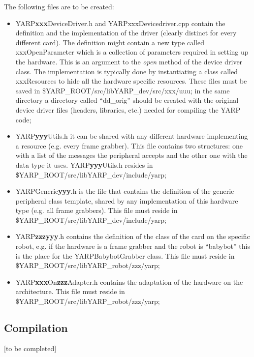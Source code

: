 The following files are to be created:
\begin{itemize}

\item YARP{\bf xxx}DeviceDriver.h and YARPxxxDevicedriver.cpp contain the definition and the implementation of the driver (clearly distinct for every different card). The definition might contain a new type called xxxOpenParameter which is a collection of parameters required in setting up the hardware. This is an argument to the {\em open} method of the device driver class. The implementation is typically done by instantiating a class called xxxResources to hide all the hardware specific resources. These files must be saved in \$YARP\_ROOT/src/libYARP\_dev/src/xxx/uuu; in the same directory a directory called ``dd\_orig'' should be created with the original device driver files (headers, libraries, etc.) needed for compiling the YARP code;

\item YARP{\bf yyy}Utils.h it can be shared with any different hardware implementing a resource (e.g. every frame grabber). This file contains two structures: one with a list of the messages the peripheral accepts and the other one with the data type it uses. YARP{\bf yyy}Utils.h resides in \$YARP\_ROOT/src/libYARP\_dev/include/yarp;

\item YARPGeneric{\bf yyy}.h is the file that contains the definition of the generic peripheral class template, shared by any implementation of this hardware type (e.g. all frame grabbers). This file must reside in \$YARP\_ROOT/src/libYARP\_dev/include/yarp;


\item YARP{\bf zzzyyy}.h contains the definition of the class of the card on the specific robot, e.g. if the hardware is a frame grabber and the robot is ``babybot'' this is the place for the YARPBabybotGrabber class. This file must reside in \$YARP\_ROOT/src/libYARP\_robot/zzz/yarp;

\item YARP{\bf xxx}On{\bf zzz}Adapter.h contains the adaptation of the hardware on the architecture. This file must reside in \$YARP\_ROOT/src/libYARP\_robot/zzz/yarp;

\end{itemize}


\subsection{Compilation}
[to be completed]


